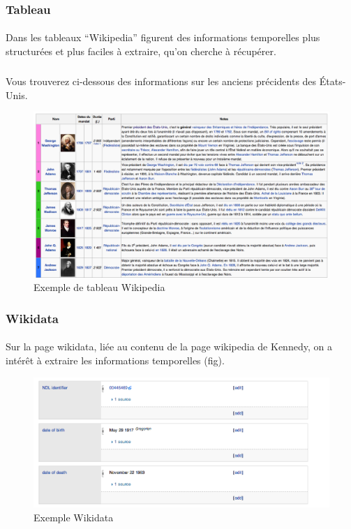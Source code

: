 \subsubsection*{Tableau}
\paragraph{}
Dans les tableaux “Wikipedia” figurent des informations temporelles plus structurées et plus faciles à extraire, qu’on cherche à récupérer.
\subparagraph{}
Vous trouverez ci-dessous des informations sur les anciens précidents des États-Unis.
\begin{figure}[H]
        \centering
                \centering
                \includegraphics[width=14cm]{tableau.png}
               \caption{Exemple de tableau Wikipedia}

\end{figure}
\subsubsection*{Wikidata}
\paragraph{}
Sur la page wikidata, liée au contenu de la page wikipedia de Kennedy, on a intérêt à extraire les informations temporelles (fig).
\begin{figure}[H]
        \centering
                \centering
                \includegraphics[width=14cm]{wikidata.png}
               \caption{Exemple Wikidata}

\end{figure}
